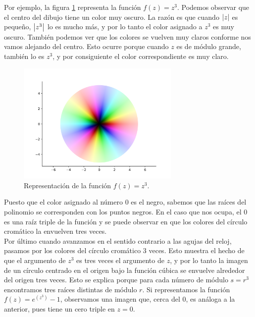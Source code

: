 Por ejemplo, la figura \ref{fig:z^3} representa la función $f(z) = z^3$. Podemos observar que el centro del dibujo tiene un color muy oscuro. La razón es que cuando $\left\lvert z\right\rvert$ es pequeño, $\left\lvert z^3\right\rvert$ lo es mucho más, y por lo tanto el color asignado a $z^3$ es muy oscuro. También podemos ver que los colores se vuelven muy claros conforme nos vamos alejando del centro. Esto ocurre porque cuando $z$ es de módulo grande, también lo es $z^3$, y por consiguiente el color correspondiente es muy claro. \\

\begin{figure}[!htbp]
    \centering
    \includegraphics[width=0.7\textwidth]{../Aplicacion/z^3.png}
    \caption{Representación de la función $f(z) = z^3$.}
    \label{fig:z^3}
\end{figure}

Puesto que el color asignado al número $0$ es el negro, sabemos que las raíces del polinomio se corresponden con los puntos negros. En el caso que nos ocupa, el $0$ es una raíz triple de la función y se puede observar en que los colores del círculo cromático la envuelven tres veces. \\

Por último cuando avanzamos en el sentido contrario a las agujas del reloj, pasamos por los colores del círculo cromático $3$ veces. Esto muestra el hecho de que el argumento de $z^3$ es tres veces el argumento de $z$, y por lo tanto la imagen de un círculo centrado en el origen bajo la función cúbica se envuelve alrededor del origen tres veces. Esto se explica porque para cada número de módulo $s=r^3$ encontramos tres raíces distintas de módulo $r$. Si representamos la función $f(z)=e^(z^3)-1$, observamos una imagen que, cerca del $0$, es análoga a la anterior, pues tiene un cero triple en $z=0$. \\


